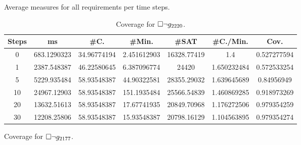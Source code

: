 {\begin{table}[!t]
\centering
\caption{Average measures for all requirements per time steps.}
\begin{tabular}{|c|c|c|c|c|c|c|}
\hline
Steps & ms &  \#C. & \#Min. & \#SAT & \#C./Min. & Cov.\\
\hline
0 & 683.1290323 & 34.96774194 & 2.451612903 & 16328.77419 & 1.4 & 0.527277594\\
1 & 2387.548387 & 46.22580645 & 6.387096774 & 24420 & 1.650232484 & 0.572533254\\
5 & 5229.935484 & 58.93548387 & 44.90322581 & 28355.29032 & 1.639645689 & 0.84956949\\
10 & 24967.12903 & 58.93548387 & 151.1935484 & 25566.54839 & 1.460869285 & 0.918973269\\
20 & 13632.51613 & 58.93548387 & 17.67741935 & 20849.70968 & 1.176272506 & 0.979354259\\
30 & 12208.25806 & 58.93548387 & 15.93548387 & 20798.16129 & 1.104563895 & 0.979354274\\
\hline
\end{tabular}
\vspace{0.5cm}
\label{tab:pdt}
\centering
\begin{minipage}{0.45\textwidth}
\caption{Coverage for ${{\square}} \lnot g_{2177}$.}
\label{tab:pdt2324}
\end{minipage}
\begin{minipage}{0.45\textwidth}
\caption{Coverage for ${{\square}} \lnot g_{2220}$.}
\end{minipage}
\end{table}}

